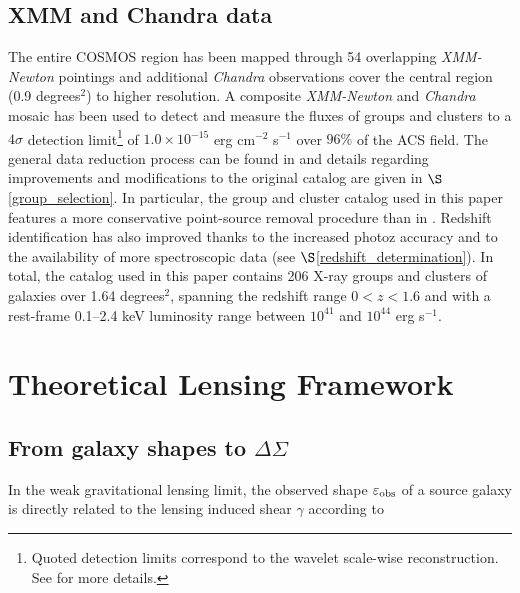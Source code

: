 \documentclass[12pt]{emulateapj}
\newcommand{\ngroup}{206 }      %
\newcommand{\flux}{erg cm$^{-2}$ s$^{-1}$ }
\begin{document}
\subsection{XMM and Chandra data}

The entire COSMOS region has been mapped through 54 overlapping {\sl
  XMM-Newton} pointings and additional {\sl Chandra} observations
cover the central region (0.9 degrees$^2$) to higher resolution. A
composite {\sl XMM-Newton} and {\sl Chandra} mosaic has been used to
detect and measure the fluxes of groups and clusters to a $4\sigma$
detection limit\footnote[1]{Quoted detection limits correspond to the
  wavelet scale-wise reconstruction. See \citet{Finoguenov:2007} for
  more details.} of $1.0\times 10^{-15}$ \flux over $96\%$ of the ACS
field. The general data reduction process can be found in
\citet{Finoguenov:2007} and details regarding improvements and
modifications to the original catalog are given in
$\S$\ref{group_selection}. In particular, the group and cluster
catalog used in this paper features a more conservative point-source
removal procedure than in \citet{Finoguenov:2007}. Redshift
identification has also improved thanks to the increased photoz
accuracy and to the availability of more spectroscopic data (see
$\S$\ref{redshift_determination}). In total, the catalog used in this
paper contains \ngroup X-ray groups and clusters of galaxies over 1.64
degrees$^2$, spanning the redshift range $0<z<1.6$ and with a
rest-frame 0.1--2.4 keV luminosity range between $10^{41}$ and
$10^{44}$ erg s$^{-1}$.


\section{Theoretical Lensing Framework}\label{lensing_theory}

\subsection{From galaxy shapes to $\Delta\Sigma$}

In the weak gravitational lensing limit, the observed shape
$\varepsilon_{\rm obs}$ of a source galaxy is directly related to the
lensing induced shear $\gamma$ according to
\end{document}
